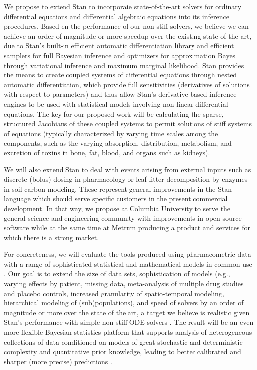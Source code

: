 \documentclass[11pt]{article}
\begin{document}
We propose to extend Stan to incorporate state-of-the-art solvers for
ordinary differential equations and differential algebraic equations
into its inference procedures.  Based on the performance of our
non-stiff solvers, we believe we can achieve an order of magnitude or
more speedup over the existing state-of-the-art, due to Stan's
built-in efficient automatic differentiation library and efficient
samplers for full Bayesian inference and optimizers for approximation
Bayes through variational inference and maximum marginal likelihood.
Stan provides the means to create coupled systems of differential
equations through nested automatic differentiation, which provide full
sensitivities (derivatives of solutions with respect to parameters)
\citep{lee-hovland:2002,serban-hindmarsh:2003,carpenter-et-al:2015} and
thus allow Stan's derivative-based inference engines to be used with
statistical models involving non-linear differential equations.  The
key for our proposed work will be calculating the sparse, structured
Jacobians of these coupled systems to permit solutions of stiff
systems of equations (typically characterized by varying time scales
among the components, such as the varying absorption, distribution,
metabolism, and excretion of toxins in bone, fat, blood, and organs
such as kidneys).

We will also extend Stan to deal with events arising from external
inputs such as discrete (bolus) dosing in pharmacology or leaf-litter
decomposition by enzymes in soil-carbon modeling. These represent
general improvements in the Stan language which should serve specific
customers in the present commercial development.  In that way, we
propose at Columbia University to serve the general science and
engineering community with improvements in open-source software while
at the same time at Metrum producing a product and services for which
there is a strong market.

For concreteness, we will evaluate the tools produced using
pharmacometric data with a range of sophisticated statistical and
mathematical models in common use \citep[e.g.,][]{ette-williams:2007,
  schmidt-derendorf:2014}. Our goal is to extend the size of data
sets, sophistication of models (e.g., varying effects by patient,
missing data, meta-analysis of multiple drug studies and placebo
controls, increased granularity of spatio-temporal modeling,
hierarchical modeling of (sub)populations), and speed of solvers by an
order of magnitude or more over the state of the art, a target we
believe is realistic given Stan's performance with simple non-stiff
ODE solvers \citep{weber-et-al:2014}.  The result will be an even more
flexible Bayesian statistics platform that supports analysis of
heterogeneous collections of data conditioned on models of great
stochastic and deterministic complexity and quantitative prior
knowledge, leading to better calibrated and sharper (more precise)
predictions \citep[see, e.g.,][]{gneiting-et-al:2007}.
\end{document}
